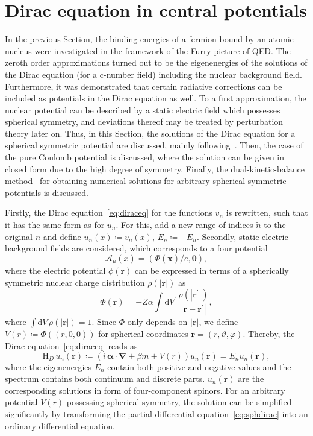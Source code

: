 \section{Dirac equation in central potentials}
\label{sec:sph_dirac}
In the previous Section, the binding energies of a fermion bound by an atomic nucleus were investigated in the framework of the Furry picture of QED. The zeroth order approximations turned out to be the eigenenergies of the solutions of the Dirac equation (for a c-number field) including the nuclear background field. Furthermore, it was demonstrated that certain radiative corrections can be included as potentials in the Dirac equation as well. To a first approximation, the nuclear potential can be described by a static electric field which possesses spherical symmetry, and deviations thereof may be treated by perturbation theory later on. Thus, in this Section, the solutions of the Dirac equation for a spherical symmetric potential are discussed, mainly following~\cite{greiner2000, weinberg2005}. Then, the case of the pure Coulomb potential is discussed, where the solution can be given in closed form due to the high degree of symmetry. Finally, the dual-kinetic-balance method~\cite{Shabaev2004} for obtaining numerical solutions for arbitrary spherical symmetric potentials is discussed.

Firstly, the Dirac equation~\eqref{eq:diraceq} for the functions $v_n$ is rewritten, such that it has the same form as for $u_n$. For this, add a new range of indices $\tilde{n}$ to the original $n$ and define $u_{\tilde{n}}(x)\coloneqq v_n(x)$, $E_{\tilde{n}}\coloneqq -E_n$. Secondly, static electric background fields are considered, which corresponds to a four potential
\begin{equation}
\mathcal{A}_\mu(x)=(\Phi(\mathbf{x})/e,\mathbf{0}),
\end{equation}
where the electric potential $\phi(\mathbf{r})$ can be expressed in terms of a spherically symmetric nuclear charge distribution $\rho(\mathbf{|r|})$ as
\begin{equation}
\label{eq:furry_elPot}
\Phi(\mathbf{r})=-Z\alpha\int\mathrm{d}V^{\prime}\,\frac{\rho(|\mathbf{r^{\prime}}|)}{|\mathbf{r}-\mathbf{r^{\prime}}|},
\end{equation}
where $\int \mathrm{d}V\,\rho(|\mathbf{r}|)=1$. Since $\Phi$ only depends on $|\mathbf{r}|$, we define $V(r)\coloneqq \Phi((r,0,0))$ for spherical coordinates $\mathbf{r}=(r,\vartheta,\varphi)$. Thereby, the Dirac equation~\eqref{eq:diraceq} reads as
\begin{equation}
\text{H}_D \, u_n(\mathbf{r})\coloneqq\left( i\,\pmb{\alpha} \cdot \mathbf{\nabla} + \beta m + V(r) \right) u_n(\mathbf{r}) =  E_n u_n(\mathbf{r}),
\label{eq:sphdirac}
\end{equation}
where the eigenenergies $E_n$ contain both positive and negative values and the spectrum contains both continuum and discrete parts. $u_n(\mathbf{r})$ are the corresponding solutions in form of four-component spinors. For an arbitrary potential $V(r)$ possessing spherical symmetry, the solution can be simplified significantly by transforming the partial differential equation~\eqref{eq:sphdirac} into an ordinary differential equation.

